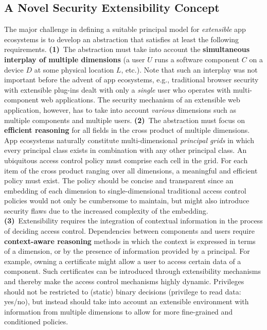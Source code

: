 \documentclass{src/acm_proc_article-sp} \else
\begin{document}
\subsection{A Novel Security Extensibility Concept}


The major challenge in defining a suitable principal model
for \emph{extensible} app ecosystems is to develop an
abstraction that satisfies at least the following
requirements.
\textbf{(1)}~The abstraction must take into account the
\textbf{simultaneous interplay of multiple dimensions} (a
user $U$ runs a software component $C$ on a device $D$ at
some physical location $L$, etc.). Note that such an interplay was not
important before the advent of app ecosystems, e.g.,
traditional browser security with extensible plug-ins dealt
with only a \emph{single} user who operates with multi-component
web applications. The security mechanism of an extensible
web application, however, has to take into account \emph{various}
dimensions such as multiple components and multiple users.
\textbf{(2)}~The abstraction must focus on \textbf{efficient
reasoning} for all fields in the cross product of multiple
dimensions. App ecosystems naturally constitute
multi-dimensional \emph{principal grids} in which every principal
class exists in combination with any other principal class.
An ubiquitous access control policy must comprise each cell
in the grid. For each item of the cross product ranging over
all dimensions, a meaningful and efficient policy must
exist. The policy should be concise and transparent since an
embedding of each dimension to single-dimensional
traditional access control policies would not only be
cumbersome to maintain, but might also introduce security
flaws due to the increased complexity of the embedding.
\textbf{(3)}~Extensibility requires the integration of
contextual information in the process of deciding access
control. Dependencies between components and users require
\textbf{context-aware reasoning} methods in which the
context is expressed in terms of a dimension, or by the
presence of information provided by a principal. For
example, owning a certificate might allow a user to access
certain data of a component. Such certificates can be
introduced through extensibility mechanisms and thereby make
the access control mechanisms highly dynamic. Privileges
should not be restricted to (static) binary decisions
(privilege to read data: yes/no), but instead should take
into account an extensible environment with information from
multiple dimensions to allow for more fine-grained and
conditioned policies.
\end{document}

